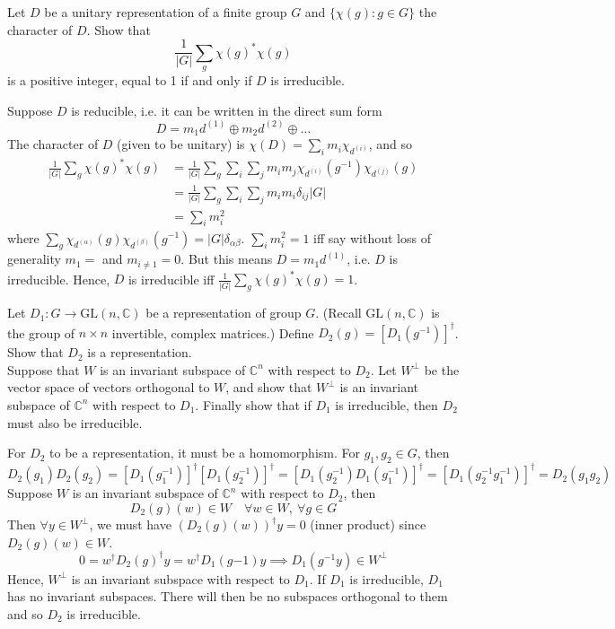 \documentclass[a4paper]{article}
\begin{document}
\newpage
\begin{qns}
Let $D$ be a unitary representation of a finite group $G$ and $\{\chi(g) : g \in G\}$ the character of $D$. Show that
$$\frac{1}{|G|}\sum_g\chi(g)^*\chi(g)$$
is a positive integer, equal to 1 if and only if $D$ is irreducible.
\end{qns}
\begin{ans}
Suppose $D$ is reducible, i.e. it can be written in the direct sum form
$$D=m_1d^{(1)}\oplus m_2d^{(2)}\oplus\dots$$
The character of $D$ (given to be unitary) is $\chi(D)=\sum_im_i\chi_{d^{(i)}}$, and so
\begin{align}
    \frac{1}{|G|}\sum_g\chi(g)^*\chi(g)&=\frac{1}{|G|}\sum_g\sum_i\sum_jm_im_j\chi_{d^{(i)}}(g^{-1})\chi_{d^{(j)}}(g)\nonumber\\&=\frac{1}{|G|}\sum_g\sum_i\sum_jm_im_i\delta_{ij}|G|\nonumber\\&=\sum_im_i^2\nonumber
\end{align}
where $\sum_g\chi_{d^{(\alpha)}}(g)\chi_{d^{(\beta)}}(g^{-1})=|G|\delta_{\alpha\beta}$. $\sum_im_i^2=1$ iff say without loss of generality $m_1=$ and $m_{i\neq 1}=0$. But this means $D=m_1d^{(1)}$, i.e. $D$ is irreducible. Hence, $D$ is irreducible iff $\frac{1}{|G|}\sum_g\chi(g)^*\chi(g)=1$.
\end{ans}
\begin{qns}
Let $D_1 : G \rightarrow\text{GL}(n, \mathbb{C})$ be a representation of group $G$. (Recall $\text{GL}(n, \mathbb{C})$ is the group of $n\times n$ invertible, complex matrices.) Define $D_2(g) = [D_1(g^{-1})]^\dag$. Show that $D_2$ is a representation.\\[5pt]
Suppose that $W$ is an invariant subspace of $\mathbb{C}^n$ with respect to $D_2$. Let $W^\perp$ be the vector space of vectors orthogonal to $W$, and show that $W^\perp$ is an invariant subspace of $\mathbb{C}^n$ with respect to $D_1$. Finally show that if $D_1$ is irreducible, then $D_2$ must also be irreducible.
\end{qns}
\begin{ans}
For $D_2$ to be a representation, it must be a homomorphism. For $g_1,g_2\in G$, then
$$D_2(g_1)D_2(g_2)=[D_1(g_1^{-1})]^\dag[D_1(g_2^{-1})]^\dag=[D_1(g_2^{-1})D_1(g_1^{-1})]^\dag=[D_1(g_2^{-1}g_1^{-1})]^\dag=D_2(g_1g_2)$$
Suppose $W$ is an invariant subspace of $\mathbb{C}^n$ with respect to $D_2$, then
$$D_2(g)(w)\in W\quad\forall w\in W,~\forall g\in G$$
Then $\forall y\in W^\perp$, we must have
$(D_2(g)(w))^\dag y=0$ (inner product) since $D_2(g)(w)\in W$. 
$$0=w^\dag D_2(g)^\dag y=w^\dag D_1(g{-1})y\implies D_1(g^{-1}y)\in W^\perp$$
Hence, $W^\perp$ is an invariant subspace with respect to $D_1$. If $D_1$ is irreducible, $D_1$ has no invariant subspaces. There will then be no subspaces orthogonal to them and so $D_2$ is irreducible.
\end{ans}
\end{document}
